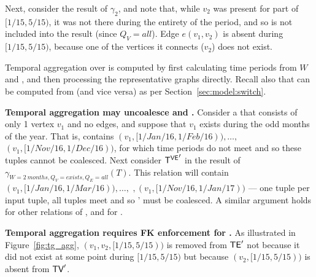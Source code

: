 Next, consider the result of $\gamma_2$, and note that, while $v_2$
was present for part of $[1/15, 5/15)$, it was not there during the
  entirety of the period, and so is not included into the result
  (since $Q_V=all$).  Edge $e(v_1, v_2)$ is absent during $[1/15,
    5/15)$, because one of the vertices it connects ($v_2$) does not
    exist.

Temporal aggregation over \trg is computed by first calculating time
periods from $W$ and \trg, and then processing the representative
graphs directly.  Recall also that \trg can be computed from \tve (and
vice versa) as per Section~\ref{sec:model:switch}.

{\bf Temporal aggregation may uncoalesce \tve and \trg.} Consider a
\tg {} that consists of only 1 vertex $v_1$ and no edges, and
suppose that $v_1$ exists during the odd months of the year.  That is,
\tv contains $(v_1, [1/Jan/16, 1/Feb/16)), \ldots,$ $(v_1,
  [1/Nov/16,1/Dec/16))$, for which time periods do not meet and so
    these tuples cannot be coalesced.  Next consider $\mathsf{T^{VE}}'$ in the
    result of $\gamma_{W=2~months, Q_V=exists,Q_E=all}(T)$.  This
    relation will contain $(v_1, [1/Jan/16, 1/Mar/16)), \ldots,$
      $,(v_1, [1/Nov/16,1/Jan/17))$ --- one tuple per input tuple, all
        tuples meet and so \tv' must be coalesced.  A similar argument
        holds for other relations of \tve, and for \trg.

{\bf Temporal aggregation requires FK enforcement for \tve.}  As
illustrated in Figure~\ref{fig:tg_agg}, $(v_1,v_2,[1/15,5/15))$ is
  removed from $\textsf{TE}'$ not because it did not exist at some point
  during $[1/15,5/15)$ but because $(v_2,[1/15,5/15))$ is absent from
      $\textsf{TV}'$.



